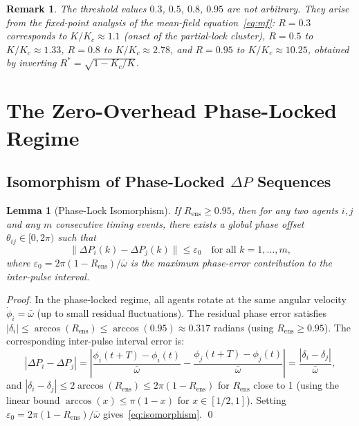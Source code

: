 \documentclass[twocolumn,10pt]{article}
\newtheorem{lemma}[theorem]{Lemma}
\newtheorem{remark}{Remark}[section]
\newcommand{\Rens}{R_{\mathrm{ens}}}
\newcommand{\Kc}{K_c}
\newcommand{\DeltaP}{\Delta P}
\begin{document}
\begin{remark}
The threshold values $0.3$, $0.5$, $0.8$, $0.95$ are not arbitrary. They arise
from the fixed-point analysis of the mean-field equation~\eqref{eq:mf}:
$R = 0.3$ corresponds to $K/\Kc \approx 1.1$ (onset of the partial-lock
cluster), $R = 0.5$ to $K/\Kc \approx 1.33$, $R = 0.8$ to $K/\Kc \approx
2.78$, and $R = 0.95$ to $K/\Kc \approx 10.25$, obtained by inverting
$R^* = \sqrt{1 - \Kc/K}$.
\end{remark}

\section{The Zero-Overhead Phase-Locked Regime}
\label{sec:zero_overhead}

\subsection{Isomorphism of Phase-Locked $\Delta P$ Sequences}

\begin{lemma}[Phase-Lock Isomorphism]
\label{lem:isomorphism}
If $\Rens \geq 0.95$, then for any two agents $i, j$ and any $m$ consecutive
timing events, there exists a global phase offset $\theta_{ij} \in [0,2\pi)$
such that
\begin{equation}
\label{eq:isomorphism}
  \|\DeltaP_i(k) - \DeltaP_j(k)\| \leq \varepsilon_0 \quad
  \text{for all } k = 1, \ldots, m,
\end{equation}
where $\varepsilon_0 = 2\pi(1-\Rens)/\bar{\omega}$ is the maximum phase-error
contribution to the inter-pulse interval.
\end{lemma}

\begin{proof}
In the phase-locked regime, all agents rotate at the same angular velocity
$\dot{\phi}_i = \bar{\omega}$ (up to small residual fluctuations). The residual
phase error satisfies $|\delta_i| \leq \arccos(\Rens) \leq \arccos(0.95)
\approx 0.317$ radians (using $\Rens \geq 0.95$). The corresponding inter-pulse
interval error is:
\[
   |\DeltaP_i - \DeltaP_j| = \left|\frac{\phi_i(t+T) - \phi_i(t)}{\bar{\omega}}
   - \frac{\phi_j(t+T) - \phi_j(t)}{\bar{\omega}}\right|
   = \frac{|\delta_i - \delta_j|}{\bar{\omega}},
\]
and $|\delta_i - \delta_j| \leq 2\arccos(\Rens) \leq 2\pi(1-\Rens)$ for
$\Rens$ close to 1 (using the linear bound $\arccos(x) \leq \pi(1-x)$ for
$x \in [1/2, 1]$). Setting $\varepsilon_0 = 2\pi(1-\Rens)/\bar{\omega}$
gives~\eqref{eq:isomorphism}. \qed
\end{proof}
\end{document}
